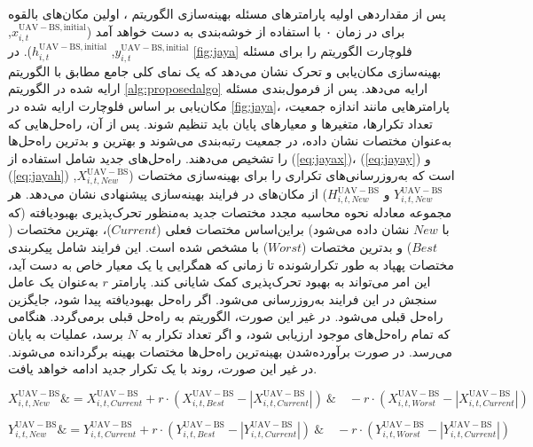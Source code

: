 پس از مقداردهی اولیه پارامترهای مسئله بهینه‌سازی الگوریتم ، اولین مکان‌های بالقوه برای  در زمان ۰ با استفاده از خوشه‌بندی  به دست خواهد آمد ($x_{i,t}^{\mathrm{UAV-BS,initial}}$, $y_{i,t}^{\mathrm{UAV-BS,initial}}$, $h_{i,t}^{\mathrm{UAV-BS,initial}}$).
در \autoref{fig:jaya} فلوچارت الگوریتم  را برای مسئله بهینه‌سازی مکان‌یابی و تحرک  نشان می‌دهد که یک نمای کلی جامع مطابق با الگوریتم ارایه شده در الگوریتم \ref{alg:proposedalgo} ارایه می‌دهد. پس از فرمول‌بندی مسئله مکان‌یابی بر اساس فلوچارت ارایه شده در \autoref{fig:jaya}، پارامترهایی مانند اندازه جمعیت، تعداد تکرارها، متغیرها و معیارهای پایان باید تنظیم شوند. پس از آن، راه‌حل‌هایی که به‌عنوان مختصات  نشان داده، در جمعیت رتبه‌بندی می‌شوند و بهترین و بدترین راه‌حل‌ها را تشخیص می‌دهند. راه‌حل‌های جدید شامل استفاده از (\autoref{eq:jayax})، (\autoref{eq:jayay}) و (\autoref{eq:jayah}) است که به‌روزرسانی‌های تکراری را برای بهینه‌سازی مختصات ($X_{i,t,New}^{\mathrm{UAV-BS}}$, $Y_{i,t,New}^{\mathrm{UAV-BS}}$ و $H_{i,t,New}^{\mathrm{UAV-BS}}$) از مکان‌های  در فرایند بهینه‌سازی پیشنهادی نشان می‌دهد. هر مجموعه معادله نحوه محاسبه مجدد مختصات جدید به‌منظور تحرک‌پذیری بهبودیافته (که با $New$ نشان داده می‌شود) براین‌اساس مختصات فعلی ($Current$)، بهترین مختصات ($Best$) و بدترین مختصات ($Worst$) با مشخص شده است. این فرایند شامل پیکربندی مختصات پهپاد به طور تکرارشونده تا زمانی که همگرایی یا یک معیار خاص به دست آید، این امر می‌تواند به بهبود تحرک‌پذیری کمک شایانی کند. پارامتر $r$ به‌عنوان یک عامل سنجش در این فرایند به‌روزرسانی می‌شود. اگر راه‌حل بهبودیافته پیدا شود، جایگزین راه‌حل قبلی می‌شود. در غیر این صورت، الگوریتم به راه‌حل قبلی برمی‌گردد. هنگامی که تمام راه‌حل‌های موجود ارزیابی شود، و اگر تعداد تکرار به $N$ برسد، عملیات به پایان می‌رسد. در صورت برآورده‌شدن بهینه‌ترین راه‌حل‌ها مختصات بهینه برگردانده می‌شوند. در غیر این صورت، روند با یک تکرار جدید ادامه خواهد یافت.


\begin{equation}
	\label{eq:jayax}
	X_{i,t,New}^{\mathrm{UAV-BS}} \&= X_{i,t,Current}^{\mathrm{UAV-BS}} + r \cdot (X_{i,t,Best}^{\mathrm{UAV-BS}}-\left | X_{i,t,Current}^{\mathrm{UAV-BS}} \right |) \
	\& \quad - r \cdot (X_{i,t,Worst}^{\mathrm{UAV-BS}}-\left | X_{i,t,Current}^{\mathrm{UAV-BS}} \right |)
\end{equation}

\begin{equation} \label{eq:jayay} 
	Y_{i,t,New}^{\mathrm{UAV-BS}} \&= Y_{i,t,Current}^{\mathrm{UAV-BS}} + r \cdot (Y_{i,t,Best}^{\mathrm{UAV-BS}}-\left | Y_{i,t,Current}^{\mathrm{UAV-BS}} \right |) \
	\& \quad - r \cdot (Y_{i,t,Worst}^{\mathrm{UAV-BS}}-\left | Y_{i,t,Current}^{\mathrm{UAV-BS}} \right |)
\end{equation}

